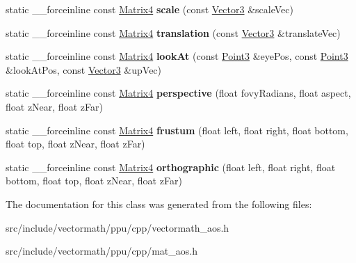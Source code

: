 \begin{DoxyCompactItemize}
\item 
\hypertarget{classVectormath_1_1Aos_1_1Matrix4_a14729610b1554409a7e1eba847bde0ac}{static \-\_\-\-\_\-forceinline const \hyperlink{classVectormath_1_1Aos_1_1Matrix4}{Matrix4} {\bfseries scale} (const \hyperlink{classVectormath_1_1Aos_1_1Vector3}{Vector3} \&scale\-Vec)}\label{classVectormath_1_1Aos_1_1Matrix4_a14729610b1554409a7e1eba847bde0ac}

\item 
\hypertarget{classVectormath_1_1Aos_1_1Matrix4_a8875d9197f01c7748c533f83f0f0e06b}{static \-\_\-\-\_\-forceinline const \hyperlink{classVectormath_1_1Aos_1_1Matrix4}{Matrix4} {\bfseries translation} (const \hyperlink{classVectormath_1_1Aos_1_1Vector3}{Vector3} \&translate\-Vec)}\label{classVectormath_1_1Aos_1_1Matrix4_a8875d9197f01c7748c533f83f0f0e06b}

\item 
\hypertarget{classVectormath_1_1Aos_1_1Matrix4_a8ec49c7b5e1ca6d8a2f7d23e278c712c}{static \-\_\-\-\_\-forceinline const \hyperlink{classVectormath_1_1Aos_1_1Matrix4}{Matrix4} {\bfseries look\-At} (const \hyperlink{classVectormath_1_1Aos_1_1Point3}{Point3} \&eye\-Pos, const \hyperlink{classVectormath_1_1Aos_1_1Point3}{Point3} \&look\-At\-Pos, const \hyperlink{classVectormath_1_1Aos_1_1Vector3}{Vector3} \&up\-Vec)}\label{classVectormath_1_1Aos_1_1Matrix4_a8ec49c7b5e1ca6d8a2f7d23e278c712c}

\item 
\hypertarget{classVectormath_1_1Aos_1_1Matrix4_aa27663057be5c6d4f43f85e87fbf0a3b}{static \-\_\-\-\_\-forceinline const \hyperlink{classVectormath_1_1Aos_1_1Matrix4}{Matrix4} {\bfseries perspective} (float fovy\-Radians, float aspect, float z\-Near, float z\-Far)}\label{classVectormath_1_1Aos_1_1Matrix4_aa27663057be5c6d4f43f85e87fbf0a3b}

\item 
\hypertarget{classVectormath_1_1Aos_1_1Matrix4_ac7db57cffc1f7bb81b062c118e0f9bc2}{static \-\_\-\-\_\-forceinline const \hyperlink{classVectormath_1_1Aos_1_1Matrix4}{Matrix4} {\bfseries frustum} (float left, float right, float bottom, float top, float z\-Near, float z\-Far)}\label{classVectormath_1_1Aos_1_1Matrix4_ac7db57cffc1f7bb81b062c118e0f9bc2}

\item 
\hypertarget{classVectormath_1_1Aos_1_1Matrix4_a9a8ca6bba76eb5bacaf748c85f379d8c}{static \-\_\-\-\_\-forceinline const \hyperlink{classVectormath_1_1Aos_1_1Matrix4}{Matrix4} {\bfseries orthographic} (float left, float right, float bottom, float top, float z\-Near, float z\-Far)}\label{classVectormath_1_1Aos_1_1Matrix4_a9a8ca6bba76eb5bacaf748c85f379d8c}

\end{DoxyCompactItemize}


The documentation for this class was generated from the following files\-:\begin{DoxyCompactItemize}
\item 
src/include/vectormath/ppu/cpp/vectormath\-\_\-aos.\-h\item 
src/include/vectormath/ppu/cpp/mat\-\_\-aos.\-h\end{DoxyCompactItemize}

